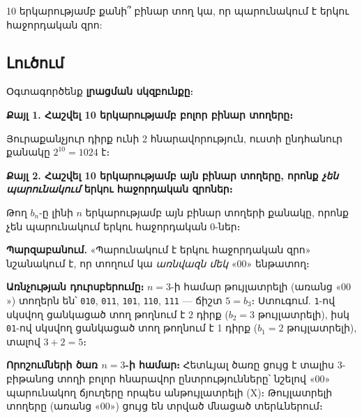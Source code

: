 \documentclass[12pt, a4paper]{article}
\begin{document}
\begin{problembox}
10 երկարությամբ քանի՞ բինար տող կա, որ պարունակում է երկու հաջորդական զրո:
\end{problembox}

\subsection*{Լուծում}

Օգտագործենք \textbf{լրացման սկզբունքը}։

\textbf{Քայլ 1. Հաշվել 10 երկարությամբ բոլոր բինար տողերը։}

Յուրաքանչյուր դիրք ունի 2 հնարավորություն, ուստի ընդհանուր քանակը $2^{10} = 1024$ է։

\textbf{Քայլ 2. Հաշվել 10 երկարությամբ այն բինար տողերը, որոնք \emph{չեն պարունակում} երկու հաջորդական զրոներ։}

Թող $b_n$-ը լինի $n$ երկարությամբ այն բինար տողերի քանակը, որոնք չեն պարունակում երկու հաջորդական $0$-ներ։

\textbf{Պարզաբանում.}\; «Պարունակում է երկու հաջորդական զրո» նշանակում է, որ տողում կա \emph{առնվազն մեկ} «$00$» ենթատող։

\textbf{Առնչության դուրսբերումը։}\; $n = 3$-ի համար թույլատրելի (առանց «$00$») տողերն են՝
\texttt{010}, \texttt{011}, \texttt{101}, \texttt{110}, \texttt{111} — ճիշտ $5 = b_3$։
Ստուգում. \texttt{1}-ով սկսվող ցանկացած տող թողնում է 2 դիրք ($b_2 = 3$ թույլատրելի), իսկ \texttt{01}-ով սկսվող ցանկացած տող թողնում է 1 դիրք ($b_1 = 2$ թույլատրելի), տալով $3 + 2 = 5$։ \checkmark

\medskip
\textbf{Որոշումների ծառ $n = 3$-ի համար։}\;
Հետևյալ ծառը ցույց է տալիս 3-բիթանոց տողի բոլոր հնարավոր ընտրությունները՝ նշելով «$00$» պարունակող ճյուղերը որպես անթույլատրելի (\textcolor{setB}{\textsf{X}})։
Թույլատրելի տողերը (առանց «$00$») ցույց են տրված մնացած տերևներում։
\end{document}
